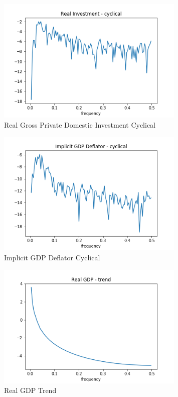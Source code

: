 \documentclass[letterpaper,11pt]{article}
\theoremstyle{definition}
\begin{document}
\begin{spacing}{1.5}
\begin{Exercise}
				\begin{figure}[H]
					\caption{Real Gross Private Domestic Investment Cyclical}
					\label{fig:real_INcy}
					\includegraphics[width=0.8\textwidth]{Real_IN_Cyclical.png}
				\end{figure}

				\begin{figure}[H]
					\caption{Implicit GDP Deflator Cyclical}
					\label{fig:GDP_deflatorcy}
					\includegraphics[width=0.8\textwidth]{Real_GDPD_Cyclical.png}
				\end{figure}

				\begin{figure}[H]
					\caption{Real GDP Trend}
					\label{fig:real_GDPtr}
					\includegraphics[width=0.8\textwidth]{Real_GDP_Trend.png}
				\end{figure}


\end{Exercise}
\end{spacing}
\end{document}
